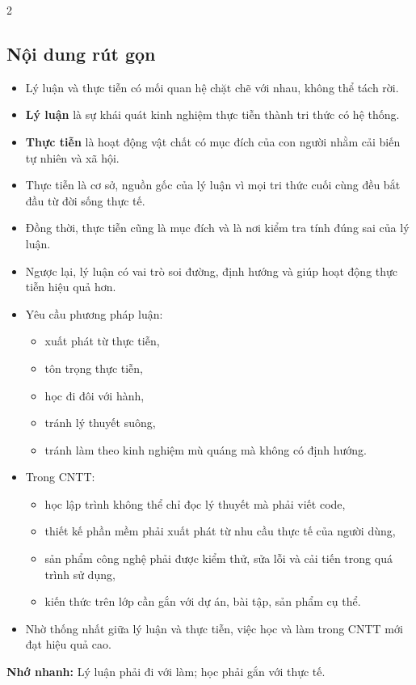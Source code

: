 \documentclass[9pt,a4paper]{extarticle}
\begin{document}
\begin{multicols*}{2}
\subsection*{Nội dung rút gọn}
\begin{itemize}
  \item Lý luận và thực tiễn có mối quan hệ chặt chẽ với nhau, không thể tách rời.
  \item \textbf{Lý luận} là sự khái quát kinh nghiệm thực tiễn thành tri thức có hệ thống.
  \item \textbf{Thực tiễn} là hoạt động vật chất có mục đích của con người nhằm cải biến tự nhiên và xã hội.
  \item Thực tiễn là cơ sở, nguồn gốc của lý luận vì mọi tri thức cuối cùng đều bắt đầu từ đời sống thực tế.
  \item Đồng thời, thực tiễn cũng là mục đích và là nơi kiểm tra tính đúng sai của lý luận.
  \item Ngược lại, lý luận có vai trò soi đường, định hướng và giúp hoạt động thực tiễn hiệu quả hơn.
  \item Yêu cầu phương pháp luận:
  \begin{itemize}
    \item xuất phát từ thực tiễn,
    \item tôn trọng thực tiễn,
    \item học đi đôi với hành,
    \item tránh lý thuyết suông,
    \item tránh làm theo kinh nghiệm mù quáng mà không có định hướng.
  \end{itemize}
  \item Trong CNTT:
  \begin{itemize}
    \item học lập trình không thể chỉ đọc lý thuyết mà phải viết code,
    \item thiết kế phần mềm phải xuất phát từ nhu cầu thực tế của người dùng,
    \item sản phẩm công nghệ phải được kiểm thử, sửa lỗi và cải tiến trong quá trình sử dụng,
    \item kiến thức trên lớp cần gắn với dự án, bài tập, sản phẩm cụ thể.
  \end{itemize}
  \item Nhờ thống nhất giữa lý luận và thực tiễn, việc học và làm trong CNTT mới đạt hiệu quả cao.
\end{itemize}

\textbf{Nhớ nhanh:} Lý luận phải đi với làm; học phải gắn với thực tế.


\end{multicols*}
\end{document}
